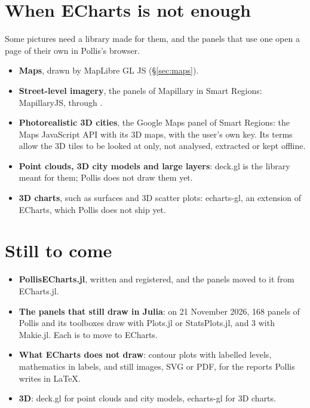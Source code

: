 \section{When ECharts is not enough}\label{sec:beyond}
Some pictures need a library made for them, and the panels that use one open a page of their own in Pollis's browser.
\begin{itemize}
  \item \textbf{Maps}, drawn by MapLibre GL JS (\S\ref{sec:maps}).
  \item \textbf{Street-level imagery}, the panels of Mapillary in Smart Regions: MapillaryJS, through
    .
  \item \textbf{Photorealistic 3D cities}, the Google Maps panel of Smart Regions: the Maps JavaScript API with its 3D
    maps, with the user's own key. Its terms allow the 3D tiles to be looked at only, not analysed, extracted or kept
    offline.
  \item \textbf{Point clouds, 3D city models and large layers}: deck.gl is the library meant for them; Pollis does not
    draw them yet.
  \item \textbf{3D charts}, such as surfaces and 3D scatter plots: echarts-gl, an extension of ECharts, which Pollis
    does not ship yet.
\end{itemize}

\section{Still to come}\label{sec:next}
\begin{itemize}
  \item \textbf{PollisECharts.jl}, written and registered, and the panels moved to it from ECharts.jl.
  \item \textbf{The panels that still draw in Julia}: on 21 November 2026, 168 panels of Pollis and its toolboxes
    draw with Plots.jl or StatsPlots.jl, and 3 with Makie.jl. Each is to move to ECharts.
  \item \textbf{What ECharts does not draw}: contour plots with labelled levels, mathematics in labels, and still images,
    SVG or PDF, for the reports Pollis writes in LaTeX.
  \item \textbf{3D}: deck.gl for point clouds and city models, echarts-gl for 3D charts.
\end{itemize}

